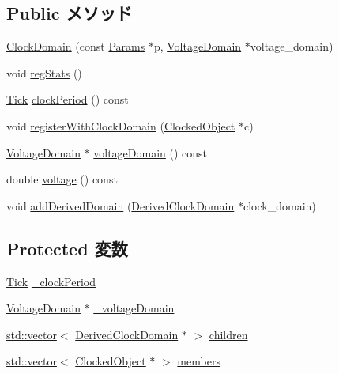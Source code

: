 \subsection*{Public メソッド}
\begin{DoxyCompactItemize}
\item 
\hyperlink{classClockDomain_aee0135126b7022e7991d8205f6b3a564}{ClockDomain} (const \hyperlink{classClockDomain_a38704c6bd51f0677b46da34c8fe16a38}{Params} $\ast$p, \hyperlink{classVoltageDomain}{VoltageDomain} $\ast$voltage\_\-domain)
\item 
void \hyperlink{classClockDomain_a4dc637449366fcdfc4e764cdf12d9b11}{regStats} ()
\item 
\hyperlink{base_2types_8hh_a5c8ed81b7d238c9083e1037ba6d61643}{Tick} \hyperlink{classClockDomain_a78c89cef17196c60470c4f2f76d43d8a}{clockPeriod} () const 
\item 
void \hyperlink{classClockDomain_a386264c9090d0bf67b5bfd6dc3dab4c7}{registerWithClockDomain} (\hyperlink{classClockedObject}{ClockedObject} $\ast$c)
\item 
\hyperlink{classVoltageDomain}{VoltageDomain} $\ast$ \hyperlink{classClockDomain_a314e91ca0b9558a7f8466ffc0a28aa12}{voltageDomain} () const 
\item 
double \hyperlink{classClockDomain_a3222f13284739dc636f7f10cd265c66f}{voltage} () const 
\item 
void \hyperlink{classClockDomain_a62a05e20bb17524c79726cd41bd2f8b1}{addDerivedDomain} (\hyperlink{classClockDomain_1_1DerivedClockDomain}{DerivedClockDomain} $\ast$clock\_\-domain)
\end{DoxyCompactItemize}
\subsection*{Protected 変数}
\begin{DoxyCompactItemize}
\item 
\hyperlink{base_2types_8hh_a5c8ed81b7d238c9083e1037ba6d61643}{Tick} \hyperlink{classClockDomain_ae748f231d6123b4a17cb15ec3d8fba30}{\_\-clockPeriod}
\item 
\hyperlink{classVoltageDomain}{VoltageDomain} $\ast$ \hyperlink{classClockDomain_a08909200ef8d20553ab6de1a129e3171}{\_\-voltageDomain}
\item 
\hyperlink{classstd_1_1vector}{std::vector}$<$ \hyperlink{classClockDomain_1_1DerivedClockDomain}{DerivedClockDomain} $\ast$ $>$ \hyperlink{classClockDomain_a8c4ecdda30297cf1946c5ebbe19e2d11}{children}
\item 
\hyperlink{classstd_1_1vector}{std::vector}$<$ \hyperlink{classClockedObject}{ClockedObject} $\ast$ $>$ \hyperlink{classClockDomain_a9d30ae54f6ce7670d180f50b7ef81526}{members}
\end{DoxyCompactItemize}
